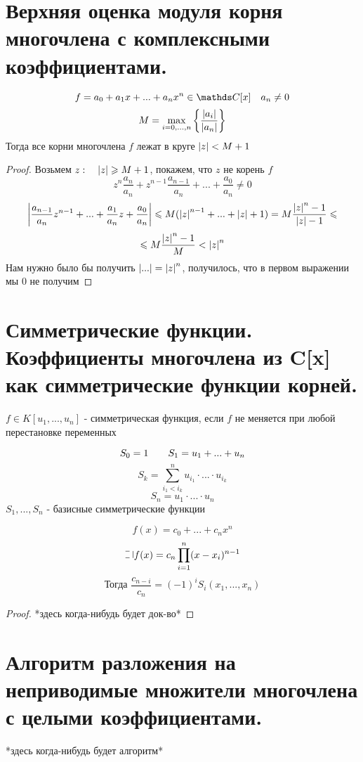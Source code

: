 \documentclass[algebra, 12pt, fleqn]{subfiles}
\begin{document}
\section{Верхняя оценка модуля корня многочлена с комплексными коэффициентами.}

  \begin{Theorem}
    	\[f = a_0 + a_1 x + ... + a_n x^n \in \CC [x] \q a_n \neq 0\]
    	\[M = \underset{i = 0, ..., n}{\max} \left\{\frac{\left|a_i\right|}{\left|a_n\right|}\right\}\]
    	Тогда все корни многочлена $f$ лежат в круге $\left|z\right| < M + 1$
  \end{Theorem}

  \begin{proof}
    	Возьмем $z :  \quad \left|z\right| \geqslant M + 1$, покажем, что $z$  не корень $f$
    	\[z^n \frac{a_n}{a_n} + z^{n - 1}  \frac{a_{n - 1} }{a_n} + ... + \frac{a_0}{a_n} \neq 0\]
    	\[\left|\frac{a_{n - 1} }{a_n} z^{n - 1} + ... + \frac{a_1}{a_n} z  + \frac{a_0}{a_n}\right| \leqslant M(\left|z\right|^{n - 1} + ... + \left|z\right| + 1)
    	= M \frac{\left|z\right|^n - 1}{\left|z\right| - 1} \leqslant\]
    	\[\leqslant M \frac{\left|z\right|^n - 1}{M} < \left|z\right|^n\]
    	Нам нужно было бы получить $\left|...\right| = \left|z\right|^n$, получилось, что в первом выражении мы 0 не получим
  \end{proof}

  \section{Симметрические функции. Коэффициенты многочлена из C[x] как симметрические функции корней.}

	\begin{definition}
  		$f \in K[u_1, ..., u_n]$ - симметрическая функция, если $f$ не меняется при любой перестановке переменных
      \begin{Example}
    		\[S_0 = 1 \qquad S_1 = u_1 + ... + u_n\]
        \[S_k = \sum_{i_1 < i_k}^n u_{i_1} \cdot ... \cdot u_{i_k}\]
        \[S_n = u_1 \cdot ... \cdot u_n\]
        $S_1,...,S_n$ - базисные симметрические функции
    	\end{Example}
	\end{definition}

	\begin{Theorem}[Виета]
		\[f(x) = c_0 + ... + c_n x^n\]
    \[\letus f(x) = c_n \prod_{i=1}^n (x - x_i)^{n-1}\]
    \[\text{Тогда } \frac{c_{n-i}}{c_n} = (-1)^i S_i (x_1,...,x_n)\]
	\end{Theorem}

	\begin{proof}
		*здесь когда-нибудь будет док-во*
	\end{proof}

  \section{Алгоритм разложения на неприводимые множители многочлена с целыми коэффициентами.}

	\begin{alg}
		*здесь когда-нибудь будет алгоритм*
	\end{alg}
\end{document}
